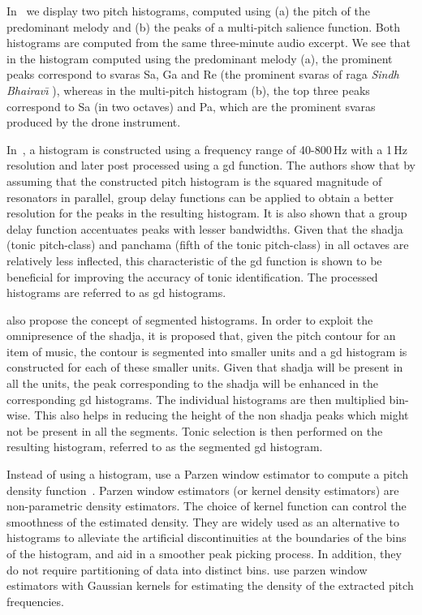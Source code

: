 In~ we display two pitch histograms, computed using (a) the pitch of the predominant melody and (b) the peaks of a multi-pitch salience function. Both histograms are computed from the same three-minute audio excerpt. We see that in the histogram computed using the predominant melody (a), the prominent peaks correspond to \glspl{svara} Sa, Ga and Re (the prominent \glspl{svara} of \gls{raga} \textit{Sindh Bhairav\={\i}} ), whereas in the multi-pitch histogram (b), the top three peaks correspond to Sa (in two octaves) and Pa, which are the prominent \glspl{svara} produced by the drone instrument. 

In~\cite{Ashwin_Istanbul2012}, a histogram is constructed using a frequency range of 40-800\,Hz with a 1\,Hz resolution and later post processed using a \gls{gd} function. The authors show that by assuming that the constructed pitch histogram is the squared magnitude of resonators in parallel, group delay functions can be applied to obtain a better resolution for the peaks in the resulting histogram. It is also shown that a group delay function accentuates peaks with lesser bandwidths. Given that the \gls{shadja} (tonic pitch-class) and \gls{panchama} (fifth of the tonic pitch-class) in all octaves are relatively less inflected, this characteristic of the \gls{gd} function is shown to be beneficial for improving the accuracy of tonic identification. The processed histograms are referred to as \gls{gd} histograms.

\cite{Ashwin_Istanbul2012} also propose the concept of segmented histograms. In order to exploit the omnipresence of the \gls{shadja},  it is proposed that, given the pitch contour for an item of music, the contour is segmented into smaller units and a \gls{gd} histogram is constructed for each of these smaller units. Given that \gls{shadja} will be present in all the units, the peak corresponding to the \gls{shadja} will be enhanced in the corresponding \gls{gd} histograms. The individual histograms are then multiplied bin-wise. This also helps in reducing the height of the non \gls{shadja} peaks which might not be present in all the segments. Tonic selection is then performed on the resulting histogram, referred to as the segmented \gls{gd} histogram.

Instead of using a histogram, \cite{ranjani2011carnatic} use a Parzen window estimator to compute a pitch density function~\citep{Bishop,DudaHart2000}. Parzen window estimators (or kernel density estimators) are non-parametric density estimators. The choice of kernel function can control the smoothness of the estimated density. They are widely used as an alternative to histograms to alleviate the artificial discontinuities at the boundaries of the bins of the histogram, and aid in a smoother peak picking process. In addition, they do not require partitioning of data into distinct bins. \cite{ranjani2011carnatic} use parzen window estimators with Gaussian kernels for estimating the density of the extracted pitch frequencies.


